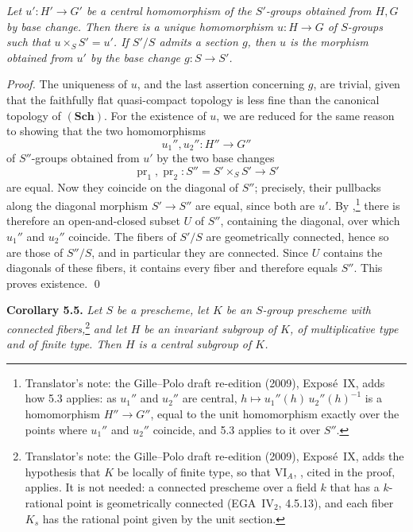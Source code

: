 \textit{Let \(u':H'\to G'\) be a central homomorphism of the
\(S'\)-groups obtained from \(H,G\) by base change. Then there is a
unique homomorphism \(u:H\to G\) of \(S\)-groups such that
\(u\times_SS'=u'\). If \(S'/S\) admits a section \(g\), then \(u\) is
the morphism obtained from \(u'\) by the base change
\(g:S\to S'\).}

\emph{Proof.}
The uniqueness of \(u\), and the last assertion concerning \(g\), are
trivial, given that the faithfully flat quasi-compact topology is less
fine than the canonical topology of \((\mathbf{Sch})\). For the existence
of \(u\), we are reduced for the same reason to showing that the two
homomorphisms
\[
  u_1'',u_2'':H''\longrightarrow G''
\]
of \(S''\)-groups obtained from \(u'\) by the two base changes
\[
  \operatorname{pr}_1,\operatorname{pr}_2:
  S''=S'\times_SS'\longrightarrow S'
\]
are equal. Now they coincide on the diagonal of \(S''\); precisely,
their pullbacks along the diagonal morphism \(S'\to S''\) are equal,
since both are \(u'\). By ,\footnote{Translator's
note: the Gille--Polo draft re-edition (2009), Expos\'e~IX, adds how 5.3
applies: as \(u_1''\) and \(u_2''\) are central,
\(h\mapsto u_1''(h)\,u_2''(h)^{-1}\) is a homomorphism \(H''\to G''\),
equal to the unit homomorphism exactly over the points where \(u_1''\)
and \(u_2''\) coincide, and 5.3 applies to it over \(S''\).}
there is therefore an open-and-closed subset \(U\) of \(S''\),
containing the diagonal, over which \(u_1''\) and \(u_2''\) coincide.
The fibers of \(S'/S\) are geometrically connected, hence so are those
of \(S''/S\), and in particular they are connected. Since \(U\)
contains the diagonals of these fibers, it contains every fiber and
therefore equals \(S''\). This proves existence. \qed

\medskip
\noindent{}\textbf{Corollary 5.5.}
\textit{Let \(S\) be a prescheme, let \(K\) be an \(S\)-group prescheme
with connected fibers,}\footnote{Translator's note: the Gille--Polo draft
re-edition (2009), Expos\'e~IX, adds the hypothesis that \(K\) be locally
of finite type, so that VI\(_A\), ,
cited in the proof, applies. It is not needed: a connected prescheme over a
field \(k\) that has a \(k\)-rational point is geometrically connected
(EGA~IV\(_2\), 4.5.13), and each fiber \(K_s\) has the rational point
given by the unit section.}%
\textit{ and let \(H\) be an invariant
subgroup of \(K\), of multiplicative type and of finite type. Then
\(H\) is a central subgroup of \(K\).}

